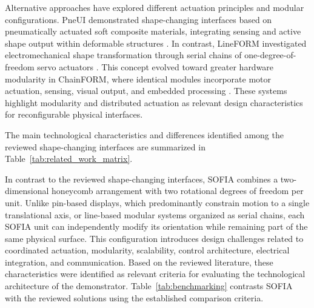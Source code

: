 \documentclass[lettersize,journal]{IEEEtran}
\begin{document}
	Alternative approaches have explored different actuation principles and
	modular configurations. PneUI demonstrated shape-changing interfaces based on
	pneumatically actuated soft composite materials, integrating sensing and active
	shape output within deformable structures \cite{yao2013pneui}. In contrast,
	LineFORM investigated electromechanical shape transformation through serial
	chains of one-degree-of-freedom servo actuators
	\cite{nakagaki2015lineform}. This concept evolved toward greater hardware
	modularity in ChainFORM, where identical modules incorporate motor actuation,
	sensing, visual output, and embedded processing
	\cite{nakagaki2016chainform}. These systems highlight modularity and
	distributed actuation as relevant design characteristics for reconfigurable
	physical interfaces.
	
	The main technological characteristics and differences identified among the
	reviewed shape-changing interfaces are summarized in
	Table~\ref{tab:related_work_matrix}.
	
	In contrast to the reviewed shape-changing interfaces, SOFIA combines a
	two-dimensional honeycomb arrangement with two rotational degrees of freedom
	per unit. Unlike pin-based displays, which predominantly constrain motion to a
	single translational axis, or line-based modular systems organized as serial
	chains, each SOFIA unit can independently modify its orientation while
	remaining part of the same physical surface. This configuration introduces
	design challenges related to coordinated actuation, modularity, scalability,
	control architecture, electrical integration, and communication. Based on the
	reviewed literature, these characteristics were identified as relevant criteria
	for evaluating the technological architecture of the demonstrator.
	Table~\ref{tab:benchmarking} contrasts SOFIA
	with the reviewed solutions using the
	established comparison criteria.
	
\end{document}
